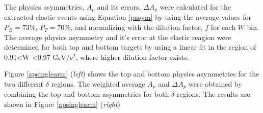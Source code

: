 \documentclass[12pt]{article}
\begin{document}
The physics asymmetries, $A_p$ and its errors, $\Delta A_p$ were calculated for the extracted elastic events using Equation \eqref{pasym} by using the average values for $P_B=73\% $, $P_T=70\%$, and normalizing with the dilution factor, $f$ for each $W$ bin. The average physics asymmetry and it's error at the elastic reagion were determined for both top and bottom targets by using a linear fit in the region of 0.91\textless W \textless0.97 GeV/c$^2$, where higher dilution factor exists.  

Figure \ref{apsinglearm} (\emph{left}) shows the top and bottom physics asymmetries for the two different $\delta$ regions. The weighted average $A_p$ and $\Delta A_p$ were obtained by combining the top and bottom asymmetries for both $\delta$ regions. The results are shown in Figure \ref{apsinglearm} (\emph{right}) 
\end{document}
